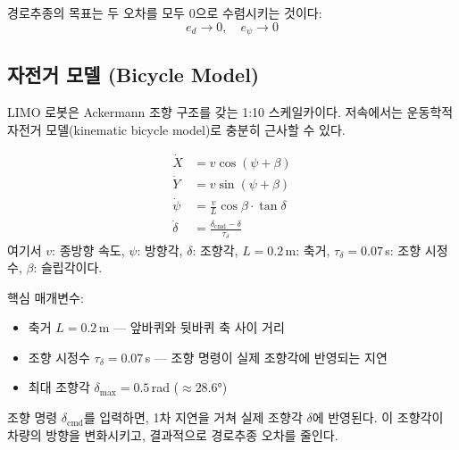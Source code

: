 경로추종의 목표는 두 오차를 모두 0으로 수렴시키는 것이다:
\begin{equation}
    e_d \to 0, \quad e_\psi \to 0
\end{equation}

\subsection{자전거 모델 (Bicycle Model)}

LIMO 로봇은 Ackermann 조향 구조를 갖는 1:10 스케일카이다.
저속에서는 운동학적 자전거 모델(kinematic bicycle model)로 충분히 근사할 수 있다.

\begin{equation}
\begin{aligned}
    \dot{X} &= v \cos(\psi + \beta) \\
    \dot{Y} &= v \sin(\psi + \beta) \\
    \dot{\psi} &= \frac{v}{L} \cos\beta \cdot \tan\delta \\
    \dot{\delta} &= \frac{\delta_\text{cmd} - \delta}{\tau_\delta}
\end{aligned}
\label{eq:bicycle}
\end{equation}
여기서 $v$: 종방향 속도, $\psi$: 방향각, $\delta$: 조향각,
$L = 0.2$\,m: 축거, $\tau_\delta = 0.07$\,s: 조향 시정수, $\beta$: 슬립각이다.

핵심 매개변수:
\begin{itemize}[nosep]
    \item 축거 $L = 0.2$\,m --- 앞바퀴와 뒷바퀴 축 사이 거리
    \item 조향 시정수 $\tau_\delta = 0.07$\,s --- 조향 명령이 실제 조향각에 반영되는 지연
    \item 최대 조향각 $\delta_\text{max} = 0.5$\,rad ($\approx 28.6°$)
\end{itemize}

조향 명령 $\delta_\text{cmd}$를 입력하면, 1차 지연을 거쳐 실제 조향각 $\delta$에 반영된다.
이 조향각이 차량의 방향을 변화시키고, 결과적으로 경로추종 오차를 줄인다.
